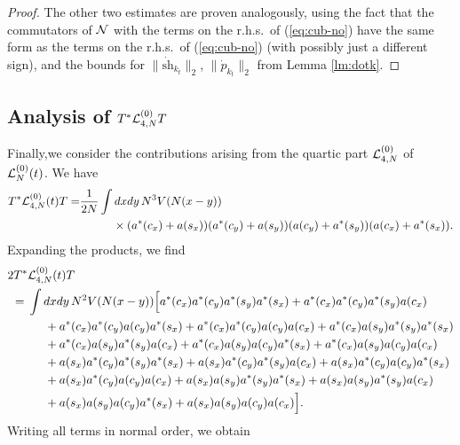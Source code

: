 \documentclass[11pt,a4paper]{article}
\newcommand{\cL}{{\cal L}}
\newcommand{\cN}{{\cal N}}
\begin{document}
\begin{proof}
The other two estimates are proven analogously, using the fact that the commutators of $\cN$ with the terms on the r.h.s.\ of (\ref{eq:cub-no}) have the same form as the terms on the r.h.s.\ of (\ref{eq:cub-no}) (with possibly just a different sign), and the bounds for $\| \dot{\text{sh}}_{k_t} \|_2$, $\| \dot{p}_{k_t} \|_2$ from Lemma \ref{lm:dotk}.
\end{proof}

\subsection{Analysis of $T^* \cL^{(0)}_{4,N} T$}

Finally,we consider the contributions arising from the quartic part $\cL_{4,N}^{(0)}$ of $\cL_N^{(0)} (t)$. We have
\[\begin{split} T^* \cL_{4,N}^{(0)} (t) T = &\frac{1}{2N} \int dx dy \, N^3
V(N (x-y)) \\ &\hspace{1cm} \times (a^* (c_x) + a (s_x)) (a^* (c_y) + a
(s_y)) (a (c_y) + a^* (s_y)) (a(c_x) + a^* (s_x)). \end{split} \] 
Expanding the products, we find 
\[ \begin{split} 
2 T^* & \cL_{4,N}^{(0)} (t) T \\ =  \; & \int dx dy \, N^2 V (N (x-y)) \Big[ a^* (c_x) a^* (c_y) a^* (s_y) a^* (s_x) + a^* (c_x) a^* (c_y) a^* (s_y) a (c_x) \\ &\hspace{.5cm} + a^* (c_x) a^* (c_y) a(c_y) a^* (s_x) + a^* (c_x) a^* (c_y) a (c_y) a (c_x)  + a^* (c_x) a (s_y) a^* (s_y) a^* (s_x)  \\ &\hspace{.5cm}  + a^* (c_x) a (s_y) a^* (s_y) a (c_x) + a^* (c_x) a (s_y) a(c_y) a^* (s_x) + a^* (c_x) a (s_y) a (c_y) a (c_x)  \\ &\hspace{.5cm}  + a (s_x) a^* (c_y) a^* (s_y) a^* (s_x) + a (s_x) a^* (c_y) a^* (s_y) a (c_x) + a (s_x) a^* (c_y) a(c_y) a^* (s_x)  \\ &\hspace{.5cm} + a (s_x) a^* (c_y) a (c_y) a (c_x)  + a (s_x) a (s_y) a^* (s_y) a^* (s_x) + a (s_x) a (s_y) a^* (s_y) a (c_x)  \\ &\hspace{.5cm}  + a (s_x) a (s_y) a(c_y) a^* (s_x) + a (s_x) a (s_y) a (c_y) a (c_x) \Big]. 
\end{split} \]
Writing all terms in normal order, we obtain
\end{document}
